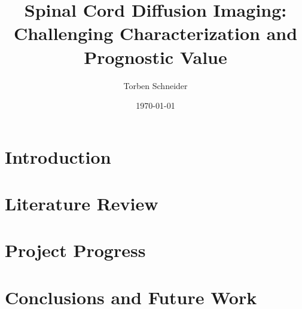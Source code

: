 \documentclass[a4paper]{scrreprt}
\begin{document}
 
\title{Spinal Cord Diffusion Imaging: Challenging Characterization and Prognostic Value} 
\date{\today} 
\author{Torben Schneider} 
\maketitle 


\chapter{Introduction} 
\chapter{Literature Review} 
\chapter{Project Progress}
 
 
\chapter{Conclusions and Future Work}
\end{document}

